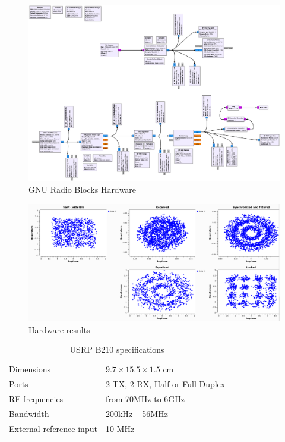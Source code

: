 \begin{figure}
	\includegraphics[width=\linewidth]{./figures/pdfs/qam_Hardware_1711.pdf}
	\caption{GNU Radio Blocks Hardware}
	\label{fig:simul16QAM_Hardware_Aufbau}	
\end{figure}

\begin{figure}
	\includegraphics[width=\linewidth]{./figures/screenshots/QAM16_Hardware_1711.png}
	\caption{Hardware results}
	\label{fig:simul16QAM__Hardware}	
\end{figure}


\begin{table}[]
	\centering
	\caption{USRP B210 specifications}
	\begin{tabular}{ll}
		\toprule
		Dimensions               & \(9.7 \times 15.5 \times 1.5\) cm \\
		Ports                    & 2 TX, 2 RX, Half or Full Duplex     \\
		RF frequencies           & from 70MHz to 6GHz                    \\
		Bandwidth                & 200kHz -- 56MHz                       \\
		External reference input & 10 MHz                                \\
		\bottomrule
	\end{tabular}
\label{tab:USRP B210 specifications}
\end{table}
